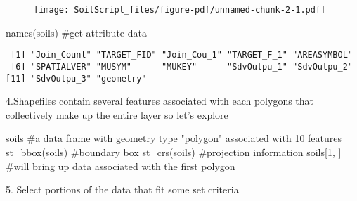 \documentclass[
  letterpaper,
]{book}
\newenvironment{Shaded}{\begin{snugshade}}{\end{snugshade}}
\newcommand{\CommentTok}[1]{\textcolor[rgb]{0.37,0.37,0.37}{#1}}
\newcommand{\DecValTok}[1]{\textcolor[rgb]{0.68,0.00,0.00}{#1}}
\newcommand{\FunctionTok}[1]{\textcolor[rgb]{0.28,0.35,0.67}{#1}}
\newcommand{\NormalTok}[1]{\textcolor[rgb]{0.00,0.23,0.31}{#1}}
\newcommand{\OtherTok}[1]{\textcolor[rgb]{0.00,0.23,0.31}{#1}}
\newcommand{\SpecialCharTok}[1]{\textcolor[rgb]{0.37,0.37,0.37}{#1}}
\begin{document}
\begin{figure}[H]

{\centering \texttt{[image: SoilScript\_files/figure-pdf/unnamed-chunk-2-1.pdf]}

}

\end{figure}

\begin{Shaded}
\begin{Highlighting}[]
\FunctionTok{names}\NormalTok{(soils) }\CommentTok{\#get attribute data}
\end{Highlighting}
\end{Shaded}

\begin{verbatim}
 [1] "Join_Count" "TARGET_FID" "Join_Cou_1" "TARGET_F_1" "AREASYMBOL"
 [6] "SPATIALVER" "MUSYM"      "MUKEY"      "SdvOutpu_1" "SdvOutpu_2"
[11] "SdvOutpu_3" "geometry"  
\end{verbatim}

\begin{Shaded}
\end{Shaded}

4.Shapefiles contain several features associated with each polygons that
collectively make up the entire layer so let's explore

\begin{Shaded}
\begin{Highlighting}[]
\NormalTok{soils }\CommentTok{\#a data frame with geometry type "polygon" associated with 10 features}
\FunctionTok{st\_bbox}\NormalTok{(soils) }\CommentTok{\#boundary box}
\FunctionTok{st\_crs}\NormalTok{(soils) }\CommentTok{\#projection information}
\NormalTok{soils[}\DecValTok{1}\NormalTok{, ] }\CommentTok{\#will bring up data associated with the first polygon}
\end{Highlighting}
\end{Shaded}

5. Select portions of the data that fit some set criteria
\end{document}
